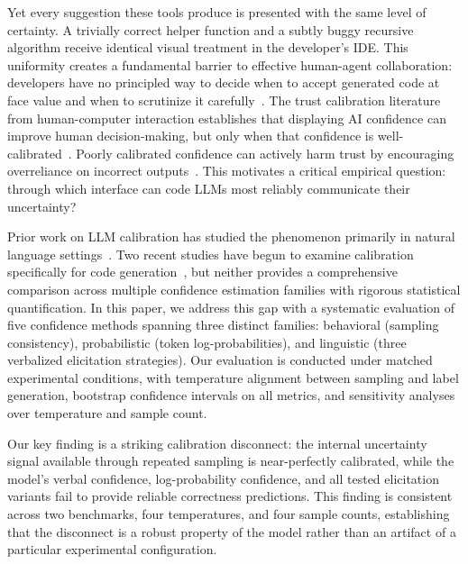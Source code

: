 \documentclass{article}
\begin{document}
Yet every suggestion these tools produce is presented with the same level of certainty. A trivially correct helper function and a subtly buggy recursive algorithm receive identical visual treatment in the developer's IDE. This uniformity creates a fundamental barrier to effective human-agent collaboration: developers have no principled way to decide when to accept generated code at face value and when to scrutinize it carefully~\citep{vaithilingam2022expectation, mozannar2024reading}. The trust calibration literature from human-computer interaction establishes that displaying AI confidence can improve human decision-making, but only when that confidence is well-calibrated~\citep{yin2019understanding, zhang2020effect}. Poorly calibrated confidence can actively harm trust by encouraging overreliance on incorrect outputs~\citep{rechkemmer2022confidence, bansal2021does}. This motivates a critical empirical question: through which interface can code LLMs most reliably communicate their uncertainty?

Prior work on LLM calibration has studied the phenomenon primarily in natural language settings~\citep{kadavath2022language, tian2023just, xiong2024can}. Two recent studies have begun to examine calibration specifically for code generation~\citep{spiess2025calibration, campos2025multicalibration}, but neither provides a comprehensive comparison across multiple confidence estimation families with rigorous statistical quantification. In this paper, we address this gap with a systematic evaluation of five confidence methods spanning three distinct families: behavioral (sampling consistency), probabilistic (token log-probabilities), and linguistic (three verbalized elicitation strategies). Our evaluation is conducted under matched experimental conditions, with temperature alignment between sampling and label generation, bootstrap confidence intervals on all metrics, and sensitivity analyses over temperature and sample count.

Our key finding is a striking calibration disconnect: the internal uncertainty signal available through repeated sampling is near-perfectly calibrated, while the model's verbal confidence, log-probability confidence, and all tested elicitation variants fail to provide reliable correctness predictions. This finding is consistent across two benchmarks, four temperatures, and four sample counts, establishing that the disconnect is a robust property of the model rather than an artifact of a particular experimental configuration.
\end{document}
